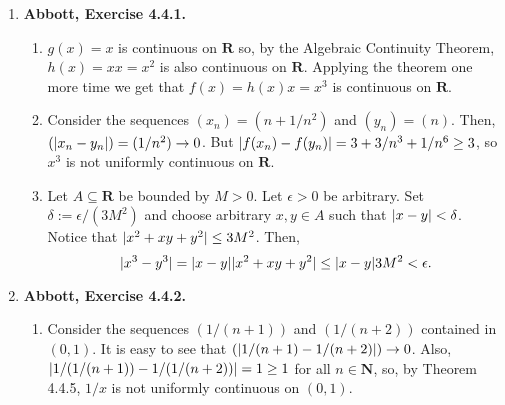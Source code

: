\documentclass{article}
\DeclarePairedDelimiter\abs{\lvert}{\rvert}
\newcommand{\N}{\mathbf{N}}
\newcommand{\Z}{\mathbf{Z}}
\newcommand{\Q}{\mathbf{Q}}
\newcommand{\I}{\mathbf{I}}
\newcommand{\R}{\mathbf{R}}
\newcommand{\exc}[2][Abbott]{\item \textbf{#1, Exercise #2.}}
\newcommand{\lep}[1][L]{#1et $\epsilon > 0$ be arbitrary}
\begin{document}
\begin{enumerate}
\begin{enumerate}
        Now, let $n \in \N$ be arbitrary. Then, $f(1) = k = f(\sum_{k=1}^n 1/n) = \sum_{k=1}^n f(1/n) = n f(1/n)$, so $f(1/n) = k/n$ for all $n \in \N$. This result is easily extended to the integers, since $f(-z)=-f(z)$. Using the same method, we can show that $f(n x) = n f(x)$ for all $n \in \N$ and all $x \in \R$. Now, let $r \in \Q$ be arbitrary. Then, we can write it as $r = a/b$ where $a,b \in \Z$. Then, $f(r)=f(a/b)= a f(1/b) = a k /b = k r$.
        
        \item Let $c \in \R$ and $(x_n) \to c$ be arbitrary. Then, $(x_n-c) \to 0$, which means, since $f$ is continuous at zero, that $\lim f(x_n -c) = f(0) = 0$. Using the additive property of $f$, we can conclude that $\lim f(x_n-c) = \lim f(x_n) - f(c) = 0$, which implies $\lim f(x_n) = f(c)$, so $f$ is continuous at $c$.
        
        Let $x \in \I$ be arbitrary. Since $\Q$ is dense in $\R$, we can form a sequence $(x_n) \to x$ where every $x_n \in \Q$. Then, $\lim f(x_n) = \lim k x_n = k x$ and since $f$ is continuous everywhere, we can conclude that $f(x) = \lim f(x_n) = k x$.
    \end{enumerate}
    
    \exc{4.4.1}
    \begin{enumerate}
        \item $g(x)=x$ is continuous on $\R$ so, by the Algebraic Continuity Theorem, $h(x)=x x = x^2$ is also continuous on $\R$. Applying the theorem one more time we get that $f(x) = h(x) x = x^3$ is continuous on $\R$.
        
        \item Consider the sequences $(x_n) = (n+1/n^2)$ and $(y_n) = (n)$. Then, $(\abs{x_n-y_n}) = (1/n^2) \to 0$. But $\abs{f(x_n)-f(y_n)} = 3 + 3/n^3 + 1/n^6 \geq 3$, so $x^3$ is not uniformly continuous on $\R$.
        
        \item Let $A \subseteq \R$ be bounded by $M > 0$. \lep. Set $\delta := \epsilon/(3M^2)$ and choose arbitrary $x,y \in A$ such that $\abs{x-y} < \delta$. Notice that $\abs{x^2 + x y + y^2} \leq 3M^2$. Then, 
        \begin{equation*}
            \abs{x^3-y^3}=\abs{x-y}\abs{x^2+ x y + y^2} \leq \abs{x-y} 3M^2 < \epsilon.
        \end{equation*}
    \end{enumerate}
    
    \exc{4.4.2}
    \begin{enumerate}
       \item Consider the sequences $(1/(n+1))$ and $(1/(n+2))$ contained in $(0, 1)$. It is easy to see that $(\abs{1/(n+1)-1/(n+2)}) \to 0$. Also, $\abs{1/(1/(n+1)) - 1/(1/(n+2))} = 1 \geq 1$ for all $n \in \N$, so, by Theorem 4.4.5, $1/x$ is not uniformly continuous on $(0, 1)$.
        

\end{enumerate}
\end{enumerate}
\end{document}

